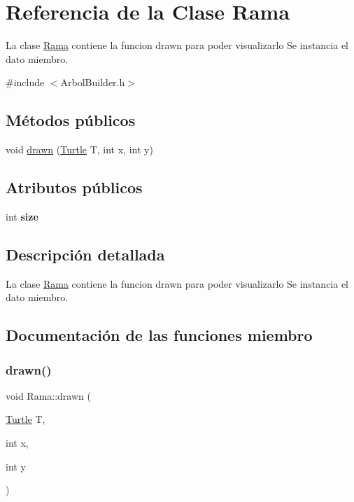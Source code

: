 \hypertarget{classRama}{}\section{Referencia de la Clase Rama}
\label{classRama}


La clase \hyperlink{classRama}{Rama} contiene la funcion drawn para poder visualizarlo  Se instancia el dato miembro.  




{\ttfamily \#include $<$Arbol\+Builder.\+h$>$}

\subsection*{Métodos públicos}
\begin{DoxyCompactItemize}
\item 
void \hyperlink{classRama_af3c32428c96a45d6ef53b1828a66073d}{drawn} (\hyperlink{classTurtle}{Turtle} T, int x, int y)
\end{DoxyCompactItemize}
\subsection*{Atributos públicos}
\begin{DoxyCompactItemize}
\item 
\mbox{\label{classRama_a679c0891200cfad9130a13c7d44e3fa5}} 
int {\bfseries size}
\end{DoxyCompactItemize}


\subsection{Descripción detallada}
La clase \hyperlink{classRama}{Rama} contiene la funcion drawn para poder visualizarlo  Se instancia el dato miembro. 

\subsection{Documentación de las funciones miembro}
\mbox{\label{classRama_af3c32428c96a45d6ef53b1828a66073d}} 
\subsubsection{\texorpdfstring{drawn()}{drawn()}}
{\footnotesize\ttfamily void Rama\+::drawn (\begin{DoxyParamCaption}\item[{\hyperlink{classTurtle}{Turtle}}]{T,  }\item[{int}]{x,  }\item[{int}]{y }\end{DoxyParamCaption})}

